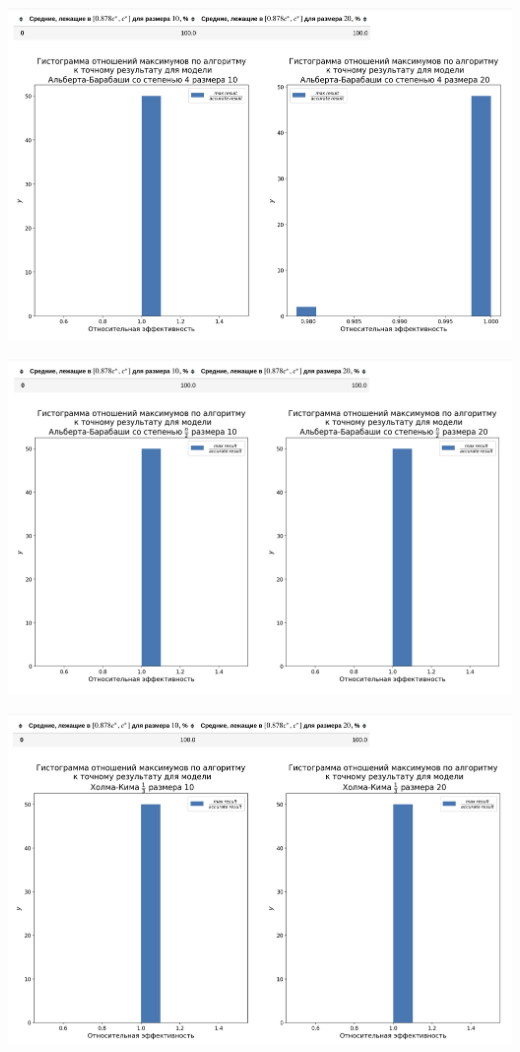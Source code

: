 \documentclass[12pt, a4paper]{article}
\begin{document}
\includegraphics[width=\textwidth]{images/6.png}

\includegraphics[width=1\textwidth]{images/7.png}

\includegraphics[width=1\textwidth]{images/8.png}
\end{document}
